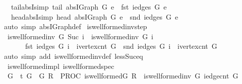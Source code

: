 \begin{isabellebody}
\ \ \ tail{\isacharunderscore}absI{\isacharbrackleft}simp{\isacharbrackright}{\isacharcolon}\ {\isachardoublequoteopen}tail\ {\isacharparenleft}abs{\isacharunderscore}IGraph\ G{\isacharparenright}\ e\ {\isacharequal}\ fst\ {\isacharparenleft}iedges\ G\ e{\isacharparenright}{\isachardoublequoteclose}\isanewline
\ \ \ head{\isacharunderscore}absI{\isacharbrackleft}simp{\isacharbrackright}{\isacharcolon}\ {\isachardoublequoteopen}head\ {\isacharparenleft}abs{\isacharunderscore}IGraph\ G{\isacharparenright}\ e\ {\isacharequal}\ snd\ {\isacharparenleft}iedges\ G\ e{\isacharparenright}{\isachardoublequoteclose}\isanewline
%
\isadelimproof
\ \ %
\endisadelimproof
%
\isatagproof
{}\isamarkupfalse%
\ {\isacharparenleft}auto\ simp{\isacharcolon}\ abs{\isacharunderscore}IGraph{\isacharunderscore}def{\isacharparenright}%
\endisatagproof
{\isafoldproof}%
%
\isadelimproof
\isanewline
%
\endisadelimproof
\isanewline
{}\isamarkupfalse%
\ is{\isacharunderscore}wellformed{\isacharunderscore}inv{\isacharunderscore}step{\isacharcolon}\isanewline
\ \ {\isachardoublequoteopen}is{\isacharunderscore}wellformed{\isacharunderscore}inv\ G\ {\isacharparenleft}Suc\ i{\isacharparenright}\ {\isasymlongleftrightarrow}\ is{\isacharunderscore}wellformed{\isacharunderscore}inv\ G\ i\isanewline
\ \ \ \ \ \ {\isasymand}\ fst\ {\isacharparenleft}iedges\ G\ i{\isacharparenright}\ {\isacharless}\ ivertex{\isacharunderscore}cnt\ G\ {\isasymand}\ snd\ {\isacharparenleft}iedges\ G\ i{\isacharparenright}\ {\isacharless}\ ivertex{\isacharunderscore}cnt\ G{\isachardoublequoteclose}\isanewline
%
\isadelimproof
\ \ %
\endisadelimproof
%
\isatagproof
{}\isamarkupfalse%
\ {\isacharparenleft}auto\ simp\ add{\isacharcolon}\ is{\isacharunderscore}wellformed{\isacharunderscore}inv{\isacharunderscore}def\ less{\isacharunderscore}Suc{\isacharunderscore}eq{\isacharparenright}%
\endisatagproof
{\isafoldproof}%
%
\isadelimproof
\isanewline
%
\endisadelimproof
\isanewline
{}\isamarkupfalse%
\ {\isacharparenleft}\ is{\isacharunderscore}wellformed{\isacharunderscore}impl{\isacharparenright}\ is{\isacharunderscore}wellformed{\isacharunderscore}spec{\isacharcolon}\isanewline
\ \ {\isachardoublequoteopen}{\isasymforall}G{\isachardot}\ {\isasymGamma}\ {\isasymturnstile}\isactrlsub t\ {\isasymlbrace}{\isasymacute}G\ {\isacharequal}\ G{\isasymrbrace}\ {\isasymacute}R\ {\isacharcolon}{\isacharequal}{\isacharequal}\ PROC\ is{\isacharunderscore}wellformed{\isacharparenleft}{\isasymacute}G{\isacharparenright}\ {\isasymlbrace}{\isasymacute}R\ {\isacharequal}\ is{\isacharunderscore}wellformed{\isacharunderscore}inv\ G\ {\isacharparenleft}iedge{\isacharunderscore}cnt\ G{\isacharparenright}{\isasymrbrace}{\isachardoublequoteclose}\isanewline

\end{isabellebody}
